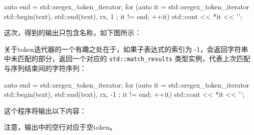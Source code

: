 \begin{cpp}
auto end = std::sregex_token_iterator{};
for (auto it = std::sregex_token_iterator{ std::begin(text),
               std::end(text), rx, 1 };
    it != end; ++it)
{
    std::cout << *it << '\n';
}
\end{cpp}

这次，得到的输出只包含名称，如下图所示：


关于token迭代器的一个有趣之处在于，如果子表达式的索引为 -1，会返回字符串中未匹配的部分，返回一个对应的 \verb|std::match_results| 类型实例，代表上次匹配与序列结束间的字符序列：

\begin{cpp}
auto end = std::sregex_token_iterator{};
for (auto it = std::sregex_token_iterator{ std::begin(text),
               std::end(text), rx, -1 };
    it != end; ++it)
{
    std::cout << *it << '\n';
}
\end{cpp}

这个程序将输出以下内容：


注意，输出中的空行对应于空token。









